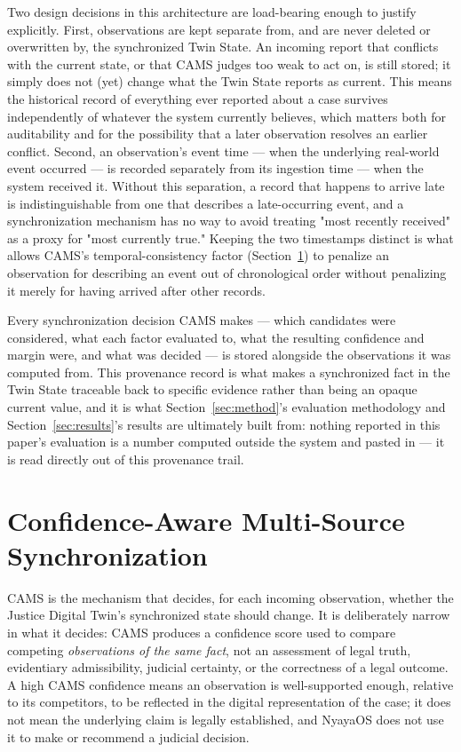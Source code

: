 \documentclass[conference]{IEEEtran}
\begin{document}
Two design decisions in this architecture are load-bearing enough to
justify explicitly. First, observations are kept separate from, and are
never deleted or overwritten by, the synchronized Twin State. An incoming
report that conflicts with the current state, or that CAMS judges too weak
to act on, is still stored; it simply does not (yet) change what the Twin
State reports as current. This means the historical record of everything
ever reported about a case survives independently of whatever the system
currently believes, which matters both for auditability and for the
possibility that a later observation resolves an earlier conflict. Second,
an observation's event time --- when the underlying real-world event
occurred --- is recorded separately from its ingestion time --- when the
system received it. Without this separation, a record that happens to
arrive late is indistinguishable from one that describes a late-occurring
event, and a synchronization mechanism has no way to avoid treating "most
recently received" as a proxy for "most currently true." Keeping the two
timestamps distinct is what allows CAMS's temporal-consistency factor
(Section~\ref{sec:cams}) to penalize an observation for describing an event
out of chronological order without penalizing it merely for having arrived
after other records.

Every synchronization decision CAMS makes --- which candidates were
considered, what each factor evaluated to, what the resulting confidence
and margin were, and what was decided --- is stored alongside the
observations it was computed from. This provenance record is what makes a
synchronized fact in the Twin State traceable back to specific evidence
rather than being an opaque current value, and it is what
Section~\ref{sec:method}'s evaluation methodology and
Section~\ref{sec:results}'s results are ultimately built from: nothing
reported in this paper's evaluation is a number computed outside the system
and pasted in --- it is read directly out of this provenance trail.

\section{Confidence-Aware Multi-Source Synchronization}
\label{sec:cams}

CAMS is the mechanism that decides, for each incoming observation, whether
the Justice Digital Twin's synchronized state should change. It is
deliberately narrow in what it decides: CAMS produces a confidence score
used to compare competing \emph{observations of the same fact}, not an
assessment of legal truth, evidentiary admissibility, judicial certainty,
or the correctness of a legal outcome. A high CAMS confidence means an
observation is well-supported enough, relative to its competitors, to be
reflected in the digital representation of the case; it does not mean the
underlying claim is legally established, and NyayaOS does not use it to
make or recommend a judicial decision.
\end{document}
